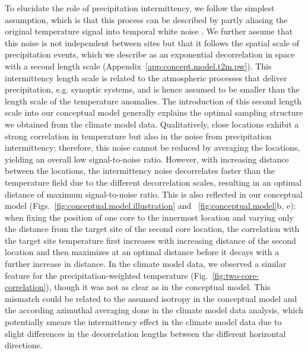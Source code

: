 \documentclass[cp]{copernicus}
\begin{document}
To elucidate the role of precipitation intermittency, we follow the simplest
assumption, which is that this process can be described by partly aliasing the
original temperature signal into temporal white noise
\citep{Laepple2018,Casado2020}. We further assume that this noise is not
independent between sites but that it follows the spatial scale of precipitation
events, which we describe as an exponential decorrelation in space with a second
length scale (Appendix~\ref{app:concept.model.t2m.pw}). This intermittency
length scale is related to the atmospheric processes that deliver precipitation,
e.g. synoptic systems, and is hence assumed to be smaller than the length scale
of the temperature anomalies. The introduction of this second length scale into
our conceptual model generally explains the optimal sampling structure we
obtained from the climate model data. Qualitatively, close locations exhibit a
strong correlation in temperature but also in the noise from precipitation
intermittency; therefore, this noise cannot be reduced by averaging the
locations, yielding an overall low signal-to-noise ratio. However, with
increasing distance between the locations, the intermittency noise decorrelates
faster than the temperature field due to the different decorrelation scales,
resulting in an optimal distance of maximum signal-to-noise ratio. This is also
reflected in our conceptual model (Figs.~\ref{fig:conceptual.model.illustration}
and ~\ref{fig:conceptual.model}b, e): when fixing the position of one core to
the innermost location and varying only the distance from the target site of the
second core location, the correlation with the target site temperature first
increases with increasing distance of the second location and then maximizes at
an optimal distance before it decays with a further increase in distance. In the
climate model data, we observed a similar feature for the precipitation-weighted
temperature (Fig.~\ref{fig:two-core-correlation}), though it was not as clear as
in the conceptual model. This mismatch could be related to the assumed isotropy
in the conceptual model and the according azimuthal averaging done in the
climate model data analysis, which potentially smears the intermittency effect
in the climate model data due to slight differences in the decorrelation lengths
between the different horizontal directions.
\end{document}
